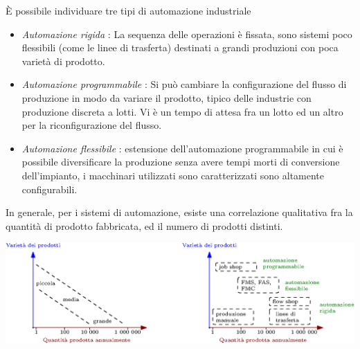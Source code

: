 \documentclass[10pt, letterpaper]{report}
\begin{document}
È possibile individuare tre tipi di automazione industriale\begin{itemize}
    \item \textit{Automazione rigida} : La sequenza delle operazioni è fissata, sono sistemi poco 
     flessibili (come le linee di trasferta) destinati a grandi produzioni con poca varietà di prodotto.
    \item \textit{Automazione programmabile} : Si può cambiare la configurazione del flusso di produzione in modo 
    da variare il prodotto, tipico delle industrie con produzione discreta a lotti. Vi è un tempo di attesa 
    fra un lotto ed un altro per la riconfigurazione del flusso.
    \item \textit{Automazione flessibile} : estensione dell'automazione programmabile in 
    cui è possibile diversificare la produzione senza avere tempi morti di 
    conversione dell'impianto,  i macchinari utilizzati sono caratterizzati sono altamente configurabili.
\end{itemize}
In generale, per i sistemi di automazione, esiste una correlazione qualitativa fra la quantità di prodotto fabbricata, ed il 
numero di prodotti distinti.\begin{center}
    \includegraphics[width=1\textwidth ]{images/quantitVarieta.eps}
\end{center}\flowerLine 
\end{document}
